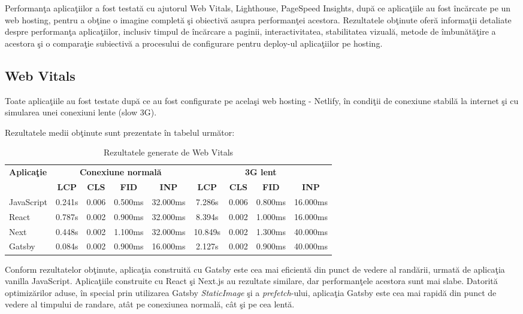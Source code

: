 \documentclass[12pt, a4paper]{report}
\begin{document}
Performan\c ta aplica\c tiilor a fost testat\u a cu ajutorul Web Vitals, Lighthouse, PageSpeed Insights, dup\u a ce aplica\c tiile au fost \^inc\u arcate pe un web hosting, pentru a ob\c tine o imagine complet\u a \c si obiectiv\u a asupra performan\c tei acestora. 
Rezultatele ob\c tinute ofer\u a informa\c tii detaliate despre performan\c ta aplica\c tiilor, inclusiv timpul de \^inc\u arcare a paginii, interactivitatea, stabilitatea vizual\u a, metode de \^imbun\u at\u a\c tire a acestora \c si o compara\c tie subiectiv\u a a procesului de configurare pentru deploy-ul aplica\c tiilor pe hosting. 

\subsection{Web Vitals}

Toate aplica\c tiile au fost testate dup\u a ce au fost configurate pe acela\c si web hosting - Netlify, \^in condi\c tii de conexiune stabil\u a la internet \c si cu simularea unei conexiuni lente (slow 3G). 

Rezultatele medii ob\c tinute sunt prezentate \^in tabelul urm\u ator:


\begin{table}[htbp]
	\centering
	\begin{tabular}{lcccccccc}
		\toprule
		\multirow{2}{*}{\textbf{Aplica\c tie}} & \multicolumn{4}{c}{\textbf{Conexiune normal\u a}} & \multicolumn{4}{c}{\textbf{3G lent}} \\
		\cmidrule(lr){2-5} \cmidrule(l){6-9}
		& \textbf{LCP} & \textbf{CLS} & \textbf{FID} & \textbf{INP} & \textbf{LCP} & \textbf{CLS} & \textbf{FID} & \textbf{INP} \\
		\midrule
		JavaScript & 0.241s & 0.006 & 0.500ms & 32.000ms & 7.286s & 0.006 & 0.800ms & 16.000ms \\
		React & 0.787s & 0.002 & 0.900ms & 32.000ms & 8.394s & 0.002 & 1.000ms & 16.000ms \\
		Next & 0.448s & 0.002 & 1.100ms & 32.000ms & 10.849s & 0.002 & 1.300ms & 40.000ms \\
		Gatsby & 0.084s & 0.002 & 0.900ms & 16.000ms & 2.127s & 0.002 & 0.900ms & 40.000ms \\
		\bottomrule
	\end{tabular}
	\caption{Rezultatele generate de Web Vitals}
	\label{tab:metrics-web-vitals}
\end{table}

Conform rezultatelor ob\c tinute, aplica\c tia construit\u a cu Gatsby este cea mai eficient\u a din punct de vedere al rand\u arii, urmat\u a de aplica\c tia vanilla JavaScript. Aplica\c tiile construite cu React \c si Next.js au rezultate similare, dar performan\c tele acestora sunt mai slabe. Datorit\u a optimiz\u arilor aduse, \^in special prin utilizarea Gatsby \textit{StaticImage} \c si a \textit{prefetch}-ului, aplica\c tia Gatsby este cea mai rapid\u a din punct de vedere al timpului de randare, at\^at pe conexiunea normal\u a, c\^at \c si pe cea lent\u a.
\end{document}
